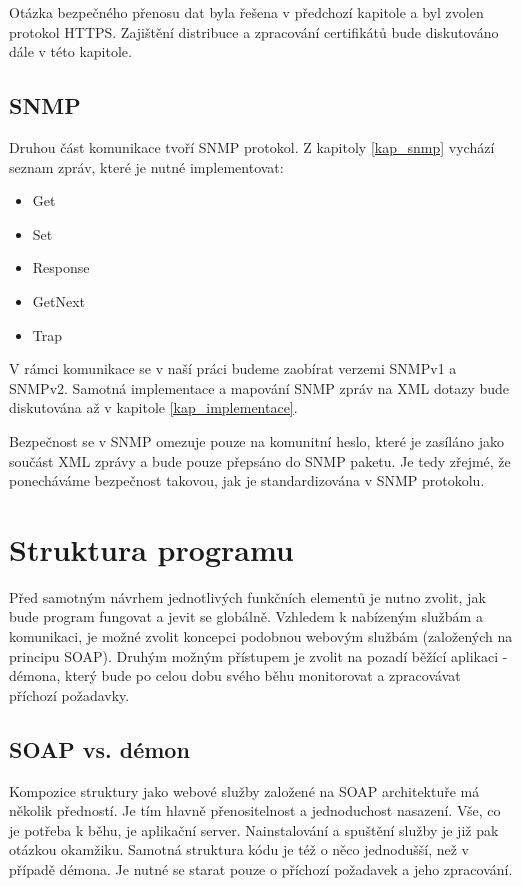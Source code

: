 
Otázka bezpečného přenosu dat byla řešena v předchozí kapitole a byl zvolen protokol HTTPS. Zajištění distribuce a zpracování certifikátů bude
diskutováno dále v této kapitole.


\subsection{SNMP}
Druhou část komunikace tvoří SNMP protokol. Z kapitoly \ref{kap_snmp} vychází seznam zpráv, které je nutné implementovat:
\begin{itemize}
	\item Get
	\item Set
	\item Response
	\item GetNext
	\item Trap
\end{itemize}

V rámci komunikace se v naší práci budeme zaobírat verzemi SNMPv1 a SNMPv2. Samotná implementace a mapování SNMP zpráv na XML dotazy
bude diskutována až v kapitole \ref{kap_implementace}.

Bezpečnost se v SNMP omezuje pouze na komunitní heslo, které je zasíláno jako součást XML zprávy a bude pouze přepsáno do SNMP paketu. 
Je tedy zřejmé, že ponecháváme bezpečnost takovou, jak je standardizována v SNMP protokolu.


\section{Struktura programu}
\label{sec_an_struktura_programu}
Před samotným návrhem jednotlivých funkčních elementů je nutno zvolit, jak bude program fungovat a jevit se globálně. Vzhledem k
nabízeným službám a komunikaci, je možné zvolit koncepci podobnou webovým službám (založených na principu SOAP). Druhým možným přístupem je zvolit
na pozadí běžící aplikaci - démona, který bude po celou dobu svého běhu monitorovat a zpracovávat příchozí požadavky.

\subsection{SOAP vs. démon}
Kompozice struktury jako webové služby založené na SOAP architektuře má několik předností. Je tím hlavně přenositelnost a jednoduchost nasazení. Vše, co je potřeba k běhu,
je aplikační server. Nainstalování a spuštění služby je již pak otázkou okamžiku. Samotná struktura kódu je též o něco jednodušší, než v případě démona. Je nutné se starat pouze o
příchozí požadavek a jeho zpracování.

